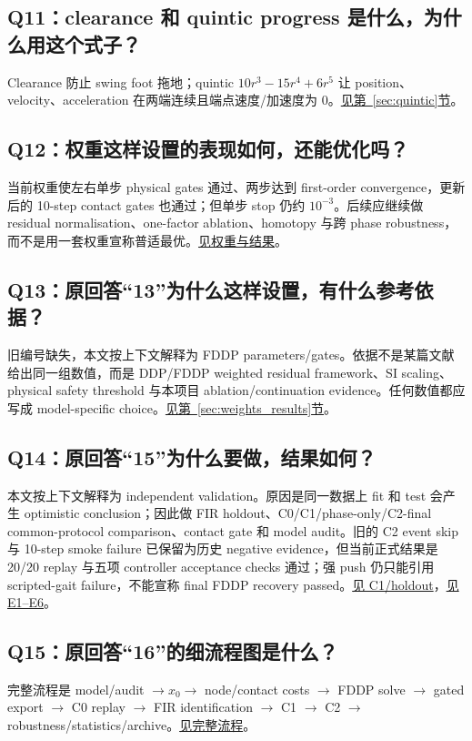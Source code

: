 \documentclass[UTF8,11pt,a4paper]{ctexart}
\begin{document}
\subsection{Q11：clearance 和 quintic progress 是什么，为什么用这个式子？}\label{q11}
Clearance 防止 swing foot 拖地；quintic $10r^3-15r^4+6r^5$ 让 position、velocity、acceleration 在两端连续且端点速度/加速度为 0。\hyperref[sec:quintic]{见第~\ref*{sec:quintic}节}。

\subsection{Q12：权重这样设置的表现如何，还能优化吗？}\label{q12}
当前权重使左右单步 physical gates 通过、两步达到 first-order convergence，更新后的 10-step contact gates 也通过；但单步 stop 仍约 $10^{-3}$。后续应继续做 residual normalisation、one-factor ablation、homotopy 与跨 phase robustness，而不是用一套权重宣称普适最优。\hyperref[sec:weights_results]{见权重与结果}。

\subsection{Q13：原回答“13”为什么这样设置，有什么参考依据？}\label{q13}
旧编号缺失，本文按上下文解释为 FDDP parameters/gates。依据不是某篇文献给出同一组数值，而是 DDP/FDDP weighted residual framework、SI scaling、physical safety threshold 与本项目 ablation/continuation evidence。任何数值都应写成 model-specific choice。\hyperref[sec:weights_results]{见第~\ref*{sec:weights_results}节}。

\subsection{Q14：原回答“15”为什么要做，结果如何？}\label{q14}
本文按上下文解释为 independent validation。原因是同一数据上 fit 和 test 会产生 optimistic conclusion；因此做 FIR holdout、C0/C1/phase-only/C2-final common-protocol comparison、contact gate 和 model audit。旧的 C2 event skip 与 10-step smoke failure 已保留为历史 negative evidence，但当前正式结果是 20/20 replay 与五项 controller acceptance checks 通过；强 push 仍只能引用 scripted-gait failure，不能宣称 final FDDP recovery passed。\hyperref[sec:balanced]{见 C1/holdout}，\hyperref[sec:evidence]{见 E1--E6}。

\subsection{Q15：原回答“16”的细流程图是什么？}\label{q15}
完整流程是 model/audit $\rightarrow x_0\rightarrow$ node/contact costs $\rightarrow$ FDDP solve $\rightarrow$ gated export $\rightarrow$ C0 replay $\rightarrow$ FIR identification $\rightarrow$ C1 $\rightarrow$ C2 $\rightarrow$ robustness/statistics/archive。\hyperref[sec:pipeline]{见完整流程}。
\end{document}

